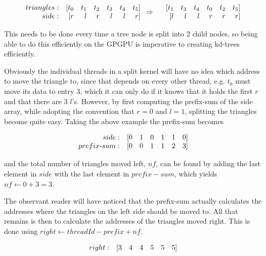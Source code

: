 \begin{displaymath}
  \begin{array} {r r r r r r r}
    triangles: & [t_0 & t_1 & t_2 & t_3 & t_4 & t_5]\\
    side: & [r & l & r & l & l & r]\\
  \end{array}
  \Rightarrow
  \begin{array} {r r r r r r r}
    &[t_1 & t_3 & t_4 & t_0 & t_2 & t_5]\\
    &[l & l & l & r & r & r]\\
  \end{array}
\end{displaymath}

This needs to be done every time a tree node is split into 2 child
nodes, so being able to do this efficiently on the GPGPU is imperative
to creating kd-trees efficiently.

Obviously the individual threads in a split kernel will have no idea
which address to move the triangle to, since that depends on every
other thread, e.g. $t_0$ must move its data to entry 3, which it can
only do if it knows that it holds the first $r$ and that there are 3
$l$'s. However, by first computing the prefix-sum of the side array,
while adopting the convention that $r = 0$ and $l = 1$, splitting the
triangles become quite easy. Taking the above example the prefix-sum
becomes

\begin{displaymath}
  \begin{array} {r r r r r r r}
    side: & [0 & 1 & 0 & 1 & 1 & 0]\\
    prefix\text{-}sum: & [0 & 0 & 1 & 1 & 2 & 3]
  \end{array}
\end{displaymath}

and the total number of triangles moved left, $nf$, can be found by
adding the last element in $side$ with the last element in $prefix-sum$,
which yields $nf \leftarrow 0 + 3 = 3$.

The observant reader will have noticed that the prefix-sum actually
calculates the addresses where the triangles on the left side should
be moved to. All that remains is then to calculate the addresses of
the triangles moved right. This is done using $right \leftarrow threadId -
prefix + nf$.

\begin{displaymath}
  \begin{array} {r r r r r r r}
    right: & [3 & 4 & 4 & 5 & 5 & 5]
  \end{array}
\end{displaymath}

